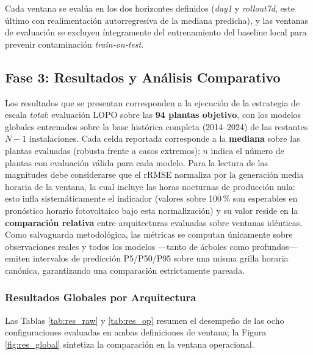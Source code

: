 Cada ventana se evalúa en los dos horizontes definidos (\textit{day1} y \textit{rollout7d}, este último con realimentación autorregresiva de la mediana predicha), y las ventanas de evaluación se excluyen íntegramente del entrenamiento del baseline local para prevenir contaminación \textit{train-on-test}.

\FloatBarrier
\subsection{Fase 3: Resultados y Análisis Comparativo}

Los resultados que se presentan corresponden a la ejecución de la estrategia de escala \textit{total}: evaluación LOPO sobre las \textbf{94 plantas objetivo}, con los modelos globales entrenados sobre la base histórica completa (2014--2024) de las restantes $N-1$ instalaciones. Cada celda reportada corresponde a la \textbf{mediana} sobre las plantas evaluadas (robusta frente a casos extremos); $n$ indica el número de plantas con evaluación válida para cada modelo. Para la lectura de las magnitudes debe considerarse que el rRMSE normaliza por la generación media horaria de la ventana, la cual incluye las horas nocturnas de producción nula: esto infla sistemáticamente el indicador (valores sobre 100\,\% son esperables en pronóstico horario fotovoltaico bajo esta normalización) y su valor reside en la \textbf{comparación relativa} entre arquitecturas evaluadas sobre ventanas idénticas. Como salvaguarda metodológica, las métricas se computan únicamente sobre observaciones reales y todos los modelos —tanto de árboles como profundos— emiten intervalos de predicción P5/P50/P95 sobre una misma grilla horaria canónica, garantizando una comparación estrictamente pareada.

\subsubsection{Resultados Globales por Arquitectura}

Las Tablas \ref{tab:res_raw} y \ref{tab:res_op} resumen el desempeño de las ocho configuraciones evaluadas en ambas definiciones de ventana; la Figura \ref{fig:res_global} sintetiza la comparación en la ventana operacional.

\begin{table}[htbp]
  \centering
  \small
  
  \caption{\label{tab:res_raw} Métricas medianas por arquitectura y horizonte — ventana \textit{Raw} (desde la primera hora registrada; 94 plantas).}
\end{table}

